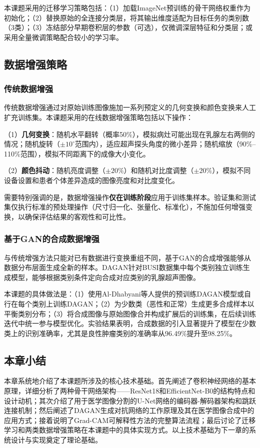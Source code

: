 本课题采用的迁移学习策略包括：（1）加载ImageNet预训练的骨干网络权重作为初始化；（2）替换原始的全连接分类层，将其输出维度适配为目标任务的类别数（3类）；（3）冻结部分早期卷积层的参数（可选），仅微调深层特征和分类层；或采用全量微调策略配合较小的学习率。


\subsection{数据增强策略}

\subsubsection{传统数据增强}

传统数据增强通过对原始训练图像施加一系列预定义的几何变换和颜色变换来人工扩充训练集。本课题采用的在线数据增强策略包括以下操作：

（1）\textbf{几何变换}：随机水平翻转（概率50\%），模拟病灶可能出现在乳腺左右两侧的情况；随机旋转（$\pm10^\circ$范围内），适应超声探头角度的微小差异；随机缩放（90\%--110\%范围），模拟不同距离下的成像大小变化。

（2）\textbf{颜色抖动}：随机亮度调整（$\pm20\%$）和随机对比度调整（$\pm20\%$），模拟不同设备设置和患者个体差异造成的图像亮度和对比度变化。

需要特别强调的是，数据增强操作\textbf{仅在训练阶段}应用于训练集样本。验证集和测试集仅执行标准的预处理操作（尺寸归一化、张量化、标准化），不施加任何增强变换，以确保评估结果的客观性和可比性。

\subsubsection{基于GAN的合成数据增强}

与传统增强方法只能对已有数据进行变换重组不同，基于GAN的合成增强能够从数据分布层面生成全新的样本。DAGAN针对BUSI数据集中每个类别独立训练生成模型，能够根据类别条件定向合成对应类别的乳腺超声图像。

本课题的具体做法是：（1）使用Al-Dhabyani等人提供的预训练DAGAN模型或自行在每个类别上训练DAGAN；（2）为少数类（恶性和正常）生成更多合成样本以平衡类别分布；（3）将合成图像与原始图像合并构成扩展后的训练集，在后续训练迭代中统一参与模型优化。实验结果表明，合成数据的引入显著提升了模型在少数类上的识别准确率，尤其是良性肿瘤类别的准确率从96.49\%提升至98.25\%。


\subsection{本章小结}

本章系统地介绍了本课题所涉及的核心技术基础。首先阐述了卷积神经网络的基本原理，详细分析了两种骨干网络架构——ResNet18和EfficientNet-B0的结构特点和设计动机；其次介绍了用于医学图像分割的U-Net网络的编码器-解码器架构和跳跃连接机制；然后阐述了DAGAN生成对抗网络的工作原理及其在医学图像合成中的应用方式；接着说明了Grad-CAM可解释性方法的完整算法流程；最后讨论了迁移学习和两类数据增强策略在本课题中的具体实现方式。以上技术基础为下一章的系统设计与实现奠定了理论基础。
